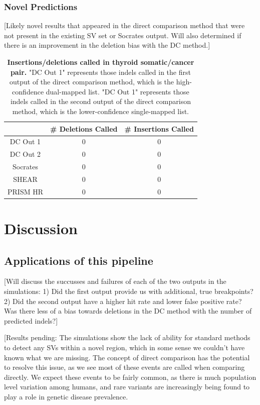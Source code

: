 \documentclass{easychithesis}
\begin{document}
\subsection{Novel Predictions}
[Likely novel results that appeared in the direct comparison method that were not present in the existing SV set or Socrates output. Will also determined if there is an improvement in the deletion bias with the DC method.]

\begin{table}[h]
\begin{center}
\begin{tabular}{|c|c|c|}\hline
         & \# Deletions Called & \# Insertions Called\\
        \hline 
        DC Out 1 & 0 & 0\\
        DC Out 2 & 0 & 0\\
        \hline 
        Socrates & 0 & 0\\
        \hline
        SHEAR & 0 & 0\\
        \hline
        PRISM HR & 0 & 0\\
	\hline
\end{tabular}
\caption{{\bf Insertions/deletions called in thyroid somatic/cancer pair.} "DC Out 1" represents those indels called in the first output of the direct comparison method, which is the high-confidence dual-mapped list. "DC Out 1" represents those indels called in the second output of the direct comparison method, which is the lower-confidence single-mapped list.}
\end{center}
\end{table}

\chapter{Discussion}
\section{Applications of this pipeline}
[Will discuss the succusses and failures of each of the two outputs in the simulations:
	1) Did the first output provide us with additional, true breakpoints?\\
	2) Did the second output have a higher hit rate and lower false positive rate?\\
Was there less of a bias towards deletions in the DC method with the number of predicted indels?]

[Results pending: The simulations show the lack of ability for standard methods to detect any SVs within a novel region, which in some sense we couldn't have known what we are missing. The concept of direct comparison has the potential to resolve this issue, as we see most of these events are called when comparing directly. We expect these events to be fairly common, as there is much population level variation among humans, and rare variants are increasingly being found to play a role in genetic disease prevalence.
\end{document}
